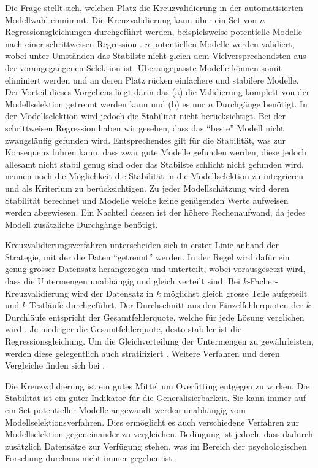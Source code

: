 Die Frage stellt sich, welchen Platz die Kreuzvalidierung in der automatisierten Modellwahl einnimmt.
Die Kreuzvalidierung kann über ein Set von $n$ Regressionsgleichungen durchgeführt werden, beispielsweise  potentielle Modelle nach einer schrittweisen Regression \cite[p. 12]{arlot2010survey}.
$n$ potentiellen Modelle werden validiert, wobei unter Umständen das Stabilste nicht gleich dem Vielversprechendsten aus der vorangegangenen Selektion ist.
Überangepasste Modelle können somit eliminiert werden und an deren Platz rücken einfachere und stabilere Modelle.
Der Vorteil dieses Vorgehens liegt darin das (a) die Validierung komplett von der Modellselektion getrennt werden kann und (b) es nur $n$ Durchgänge benötigt. 
In der Modellselektion wird jedoch die Stabilität nicht berücksichtigt. 
Bei der schrittweisen Regression haben wir gesehen, dass das ``beste'' Modell nicht zwangsläufig gefunden wird.
Entsprechendes gilt für die Stabilität, was zur Konsequenz führen kann, dass zwar gute Modelle gefunden werden, diese jedoch allesamt nicht stabil genug sind oder das Stabilste schlicht nicht gefunden wird. 
 nennen noch die Möglichkeit die Stabilität in die Modellselektion zu integrieren und als  Kriterium zu berücksichtigen. 
Zu jeder Modellschätzung wird deren Stabilität berechnet und Modelle welche keine genügenden Werte aufweisen werden abgewiesen. 
Ein Nachteil dessen ist der höhere Rechenaufwand, da jedes Modell zusätzliche Durchgänge benötigt. 

Kreuzvalidierungsverfahren unterscheiden sich in erster Linie anhand der Strategie, mit der die Daten ``getrennt'' werden.
In der Regel wird dafür ein genug grosser Datensatz herangezogen und unterteilt, wobei vorausgesetzt wird, dass die Untermengen unabhängig und gleich verteilt sind. 
Bei $k$-Facher-Kreuzvalidierung wird der Datensatz in $k$ möglichst gleich grosse Teile aufgeteilt und $k$ Testläufe durchgeführt.
Der Durchschnitt aus den Einzelfehlerquoten der $k$ Durchläufe entspricht der Gesamtfehlerquote, welche für jede Lösung verglichen wird \cite[p. 14]{arlot2010survey}.
Je niedriger die Gesamtfehlerquote, desto stabiler ist die Regressionsgleichung.
Um die Gleichverteilung der Untermengen zu gewährleisten, werden diese gelegentlich auch stratifiziert \cite{diamantidis2000unsupervised}. 
Weitere Verfahren und deren Vergleiche finden sich bei .

Die Kreuzvalidierung ist ein gutes Mittel um Overfitting entgegen zu wirken.
Die Stabilität ist ein guter Indikator für die Generalisierbarkeit. Sie kann immer auf ein Set potentieller Modelle angewandt werden unabhängig vom Modellselektionsverfahren. Dies ermöglicht es auch verschiedene Verfahren zur Modellselektion gegeneinander zu vergleichen.
Bedingung ist jedoch, dass dadurch zusätzlich Datensätze zur Verfügung stehen, was im Bereich der psychologischen Forschung durchaus nicht immer gegeben ist. 
